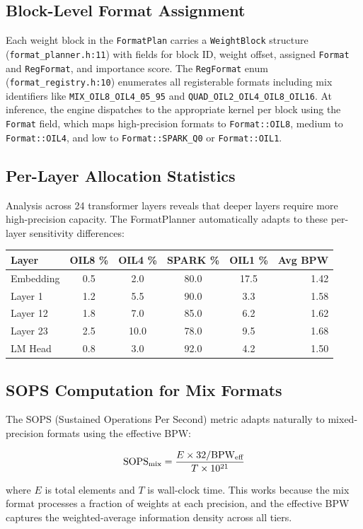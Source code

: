 \subsection{Block-Level Format Assignment}

Each weight block in the \texttt{FormatPlan} carries a
\texttt{WeightBlock} structure (\texttt{format\_planner.h:11}) with
fields for block ID, weight offset, assigned \texttt{Format} and
\texttt{RegFormat}, and importance score.  The \texttt{RegFormat}
enum (\texttt{format\_registry.h:10}) enumerates all registerable
formats including mix identifiers like \texttt{MIX\_OIL8\_OIL4\_05\_95}
and \texttt{QUAD\_OIL2\_OIL4\_OIL8\_OIL16}.  At inference, the
engine dispatches to the appropriate kernel per block using the
\texttt{Format} field, which maps high-precision formats to
\texttt{Format::OIL8}, medium to \texttt{Format::OIL4}, and low to
\texttt{Format::SPARK\_Q0} or \texttt{Format::OIL1}.

\subsection{Per-Layer Allocation Statistics}

Analysis across 24 transformer layers reveals that deeper layers require
more high-precision capacity.  The FormatPlanner automatically adapts to
these per-layer sensitivity differences:

\begin{center}
\small
\begin{tabular}{l cccc r}
\toprule
\textbf{Layer} & \textbf{OIL8 \%} & \textbf{OIL4 \%} &
  \textbf{SPARK \%} & \textbf{OIL1 \%} & \textbf{Avg BPW} \\
\midrule
Embedding & 0.5 & 2.0 & 80.0 & 17.5 & 1.42 \\
Layer 1    & 1.2 & 5.5 & 90.0 & 3.3  & 1.58 \\
Layer 12   & 1.8 & 7.0 & 85.0 & 6.2  & 1.62 \\
Layer 23   & 2.5 & 10.0 & 78.0 & 9.5 & 1.68 \\
LM Head    & 0.8 & 3.0 & 92.0 & 4.2  & 1.50 \\
\bottomrule
\end{tabular}
\end{center}

\subsection{SOPS Computation for Mix Formats}

The SOPS (Sustained Operations Per Second) metric adapts naturally to
mixed-precision formats using the effective BPW:

\begin{equation}
\text{SOPS}_{\text{mix}} = \frac{E \times 32 / \textnormal{BPW}_{\text{eff}}}
  {T \times 10^{21}}
\label{eq:sops_mix}
\end{equation}

\noindent where $E$ is total elements and $T$ is wall-clock time.  This
works because the mix format processes a fraction of weights at each
precision, and the effective BPW captures the weighted-average
information density across all tiers.
